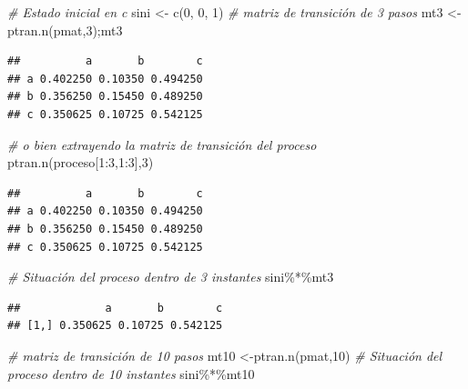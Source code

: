 \documentclass[
]{book}
\newenvironment{Shaded}{\begin{snugshade}}{\end{snugshade}}
\newcommand{\CommentTok}[1]{\textcolor[rgb]{0.56,0.35,0.01}{\textit{#1}}}
\newcommand{\DecValTok}[1]{\textcolor[rgb]{0.00,0.00,0.81}{#1}}
\newcommand{\FunctionTok}[1]{\textcolor[rgb]{0.00,0.00,0.00}{#1}}
\newcommand{\NormalTok}[1]{#1}
\newcommand{\OtherTok}[1]{\textcolor[rgb]{0.56,0.35,0.01}{#1}}
\newcommand{\SpecialCharTok}[1]{\textcolor[rgb]{0.00,0.00,0.00}{#1}}
\theoremstyle{definition}
\theoremstyle{definition}
\theoremstyle{definition}
\theoremstyle{definition}
\theoremstyle{remark}
\begin{document}
\begin{Shaded}
\begin{Highlighting}[]
\CommentTok{\# Estado inicial en c}
\NormalTok{sini }\OtherTok{\textless{}{-}} \FunctionTok{c}\NormalTok{(}\DecValTok{0}\NormalTok{, }\DecValTok{0}\NormalTok{, }\DecValTok{1}\NormalTok{)}
\CommentTok{\# matriz de transición de 3 pasos}
\NormalTok{mt3 }\OtherTok{\textless{}{-}} \FunctionTok{ptran.n}\NormalTok{(pmat,}\DecValTok{3}\NormalTok{);mt3}
\end{Highlighting}
\end{Shaded}

\begin{verbatim}
##          a       b        c
## a 0.402250 0.10350 0.494250
## b 0.356250 0.15450 0.489250
## c 0.350625 0.10725 0.542125
\end{verbatim}

\begin{Shaded}
\begin{Highlighting}[]
\CommentTok{\# o bien extrayendo la matriz de transición del proceso}
\FunctionTok{ptran.n}\NormalTok{(proceso[}\DecValTok{1}\SpecialCharTok{:}\DecValTok{3}\NormalTok{,}\DecValTok{1}\SpecialCharTok{:}\DecValTok{3}\NormalTok{],}\DecValTok{3}\NormalTok{)}
\end{Highlighting}
\end{Shaded}

\begin{verbatim}
##          a       b        c
## a 0.402250 0.10350 0.494250
## b 0.356250 0.15450 0.489250
## c 0.350625 0.10725 0.542125
\end{verbatim}

\begin{Shaded}
\begin{Highlighting}[]
\CommentTok{\# Situación del proceso dentro de 3 instantes}
\NormalTok{sini}\SpecialCharTok{\%*\%}\NormalTok{mt3}
\end{Highlighting}
\end{Shaded}

\begin{verbatim}
##             a       b        c
## [1,] 0.350625 0.10725 0.542125
\end{verbatim}

\begin{Shaded}
\begin{Highlighting}[]
\CommentTok{\# matriz de transición de 10 pasos}
\NormalTok{mt10 }\OtherTok{\textless{}{-}}\FunctionTok{ptran.n}\NormalTok{(pmat,}\DecValTok{10}\NormalTok{)}
\CommentTok{\# Situación del proceso dentro de 10 instantes}
\NormalTok{sini}\SpecialCharTok{\%*\%}\NormalTok{mt10}
\end{Highlighting}
\end{Shaded}
\end{document}
